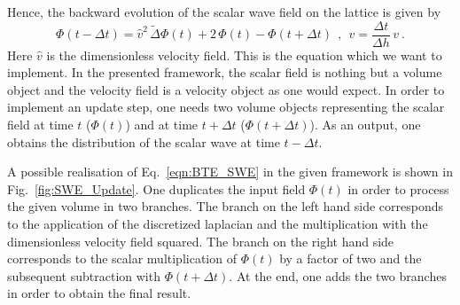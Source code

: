 \documentclass[12pt,a4paper]{article}
\newcommand{\figref}[1]{Fig.~\ref{#1}}
\newcommand{\eqnref}[1]{Eq.~\ref{#1}}
\begin{document}
Hence, 
the backward evolution of the scalar wave field on the lattice is given by
\begin{equation}
\Phi(t-\Delta t) = \hat{v}^2 \,\tilde{\Delta} \Phi(t) + 2\,\Phi(t) - \Phi(t+\Delta t)~~,~~\hat{v}=\frac{\Delta t}{\Delta h}\, v~.\label{eqn:BTE_SWE}
\end{equation}
Here $\hat{v}$ is the dimensionless velocity field. 
This is the equation which we want to implement. In the presented framework,
the scalar field is nothing but a volume object and the velocity field is a velocity 
object as one would expect. 
In order to implement an update step, one needs two volume objects representing the scalar field
at time $t$ ($\Phi(t)$) and at time $t+\Delta t$ ($\Phi(t+\Delta t)$). As an output, one obtains
the distribution of the scalar wave at time $t-\Delta t$.

A possible realisation of \eqnref{eqn:BTE_SWE} in the given framework is shown in \figref{fig:SWE_Update}.
One duplicates the input field $\Phi(t)$ in order to process the given volume in two branches. The branch
on the left hand side corresponds to the application of the discretized laplacian and the multiplication with the 
dimensionless velocity field squared. The branch on the right hand side corresponds to the scalar multiplication of $\Phi(t)$ by a factor of two and the subsequent subtraction with $\Phi(t+\Delta t)$. At the end, one adds the 
two branches in order to obtain the final result. 
 
\end{document}
